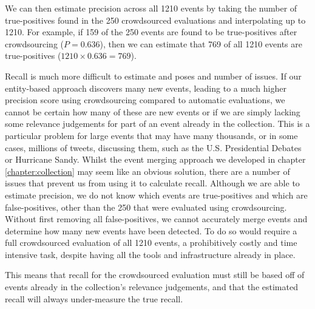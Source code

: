 We can then estimate precision across all 1210 events by taking the number of true-positives found in the 250 crowdsourced evaluations and interpolating up to 1210.
For example, if 159 of the 250 events are found to be true-positives after crowdsourcing ($P = 0.636$), then we can estimate that 769 of all 1210 events are true-positives ($1210 \times 0.636 = 769$).

Recall is much more difficult to estimate and poses and number of issues.
If our entity-based approach discovers many new events, leading to a much higher precision score using crowdsourcing compared to automatic evaluations, we cannot be certain how many of these are new events or if we are simply lacking some relevance judgements for part of an event already in the collection.
This is a particular problem for large events that may have many thousands, or in some cases, millions of tweets, discussing them, such as the U.S. Presidential Debates or Hurricane Sandy.
Whilst the event merging approach we developed in chapter \ref{chapter:collection} may seem like an obvious solution, there are a number of issues that prevent us from using it to calculate recall.
Although we are able to estimate precision, we do not know which events are true-positives and which are false-positives, other than the 250 that were evaluated using crowdsourcing.
Without first removing all false-positives, we cannot accurately merge events and determine how many new events have been detected.
To do so would require a full crowdsourced evaluation of all 1210 events, a prohibitively costly and time intensive task, despite having all the tools and infrastructure already in place.

This means that recall for the crowdsourced evaluation must still be based off of events already in the collection's relevance judgements, and that the estimated recall will always under-measure the true recall.